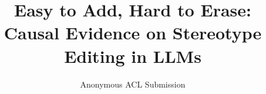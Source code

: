 \documentclass[11pt]{article}
\title{Easy to Add, Hard to Erase: Causal Evidence on Stereotype Editing in LLMs}
\author{Anonymous ACL Submission}
\begin{document}
\maketitle

\begin{abstract}

\end{abstract}




\end{document}

